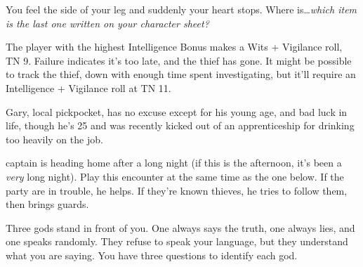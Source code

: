 \begin{multicols}{2}

\resumecontents[town]

\label{randommeetings}

\startcontents[sq]



\begin{boxtext}

	You feel the side of your leg and suddenly your heart stops.  Where is\ldots \textit{which item is the last one written on your character sheet?}

\end{boxtext}

The player with the highest Intelligence Bonus makes a Wits + Vigilance roll, TN 9.  Failure indicates it's too late, and the thief has gone.  It might be possible to track the thief, down with enough time spent investigating, but it'll require an Intelligence + Vigilance roll at TN 11.

Gary, local pickpocket, has no excuse except for his young age, and bad luck in life, though he's 25 and was recently kicked out of an apprenticeship for drinking too heavily on the job.

\humanthief



\Gls{captain} is heading home after a long night (if this is the afternoon, it's been a \emph{very} long night).  Play this encounter at the same time as the one below.  If the party are in trouble, he helps.  If they're known thieves, he tries to follow them, then brings guards.




\begin{boxtext}
Three gods stand in front of you.  One always says the truth, one always lies, and one speaks randomly.  They refuse to speak your language, but they understand what you are saying.  You have three questions to identify each god.
\end{boxtext}


\end{multicols}
